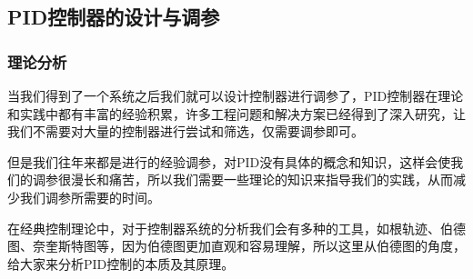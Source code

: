 \documentclass[UTF8,a4paper,12pt]{ctexart}
\begin{document}
    \subsection{PID控制器的设计与调参}
    \subsubsection{理论分析}
    \begin{flushleft}
      当我们得到了一个系统之后我们就可以设计控制器进行调参了，PID控制器在理论和实践中都有丰富的经验积累，许多工程问题和解决方案已经得到了深入研究，让我们不需要对大量的控制器进行尝试和筛选，仅需要调参即可。
    \end{flushleft}
    \begin{flushleft}
      但是我们往年来都是进行的经验调参，对PID没有具体的概念和知识，这样会使我们的调参很漫长和痛苦，所以我们需要一些理论的知识来指导我们的实践，从而减少我们调参所需要的时间。
    \end{flushleft}
    \begin{flushleft}
      在经典控制理论中，对于控制器系统的分析我们会有多种的工具，如根轨迹、伯德图、奈奎斯特图等，因为伯德图更加直观和容易理解，所以这里从伯德图的角度，给大家来分析PID控制的本质及其原理。
      
    \end{flushleft}
\end{document}
